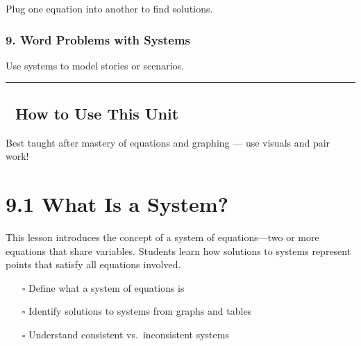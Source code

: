 \documentclass[
  letterpaper,
]{scrrept}
\providecommand{\tightlist}{%
  \setlength{\itemsep}{0pt}\setlength{\parskip}{0pt}}
\begin{document}
Plug one equation into another to find solutions.

\subsection*{9. Word Problems with
Systems}\label{word-problems-with-systems}

Use systems to model stories or scenarios.

\begin{center}\rule{0.5\linewidth}{0.5pt}\end{center}

\section*{🧭 How to Use This Unit}\label{how-to-use-this-unit-6}


Best taught after mastery of equations and graphing --- use visuals and
pair work!

\chapter*{9.1 What Is a System?}\label{what-is-a-system-1}


This lesson introduces the concept of a system of equations---two or
more equations that share variables. Students learn how solutions to
systems represent points that satisfy all equations involved.

\begin{tcolorbox}[enhanced jigsaw, colframe=quarto-callout-note-color-frame, opacitybacktitle=0.6, arc=.35mm, coltitle=black, leftrule=.75mm, toprule=.15mm, opacityback=0, bottomrule=.15mm, breakable, title={🎯 Objectives}, colback=white, bottomtitle=1mm, toptitle=1mm, titlerule=0mm, rightrule=.15mm, left=2mm, colbacktitle=quarto-callout-note-color!10!white]

\begin{itemize}
\tightlist
\item[$\square$]
  Define what a system of equations is
\item[$\square$]
  Identify solutions to systems from graphs and tables
\item[$\square$]
  Understand consistent vs.~inconsistent systems
\end{itemize}

\end{tcolorbox}
\end{document}
